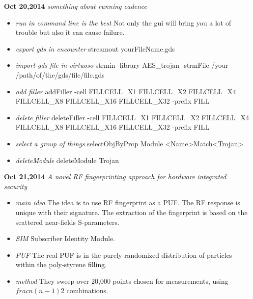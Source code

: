 \documentclass[]{article}
\begin{document}
\noindent \textbf{Oct 20,2014}
\textit{something about running cadence}
\indent		\begin{itemize}
                \item \textit{run in command line is the best} Not only the gui will bring you a lot
                        of trouble but also it can cause failure.
                \item \textit{export gds in encounter} streamout yourFileName.gds
                \item \textit{import gds file in virtuoso} strmin -library AES\_trojan -strmFile /your
                        /path/of/the/gds/file/file.gds
                \item \textit{add filler} addFiller -cell FILLCELL\_X1 FILLCELL\_X2 FILLCELL\_X4 FILLCELL\_X8 FILLCELL\_X16 FILLCELL\_X32 -prefix FILL
                \item \textit{delete filler} deleteFiller -cell FILLCELL\_X1 FILLCELL\_X2 FILLCELL\_X4 FILLCELL\_X8 FILLCELL\_X16 FILLCELL\_X32 -prefix FILL
                \item \textit{select a group of things} selectObjByProp Module <Name>Match<Trojan>
                \item \textit{deleteModule} deleteModule Trojan
            \end{itemize}

\noindent \textbf{Oct 21,2014}
\textit{A novel RF fingerprinting approach for hardware integrated security}
\indent		\begin{itemize}
                \item \textit{main idea} The idea is to use RF fingerprint as a PUF. The RF response is 
                        unique with their signature. The extraction of the fingerprint is based on the 
                        scattered near-fields S-parameters.
                \item \textit{SIM} Subscriber Identity Module.
                \item \textit{PUF} The real PUF is in the purely-randomized distribution of particles
                        within the poly-styrene filling.
                \item \textit{method} They sweep over 20,000 points chosen for measurements, using 
                        $frac{n(n-1)}{2}$ combinations.
       		\end{itemize}
\end{document}
